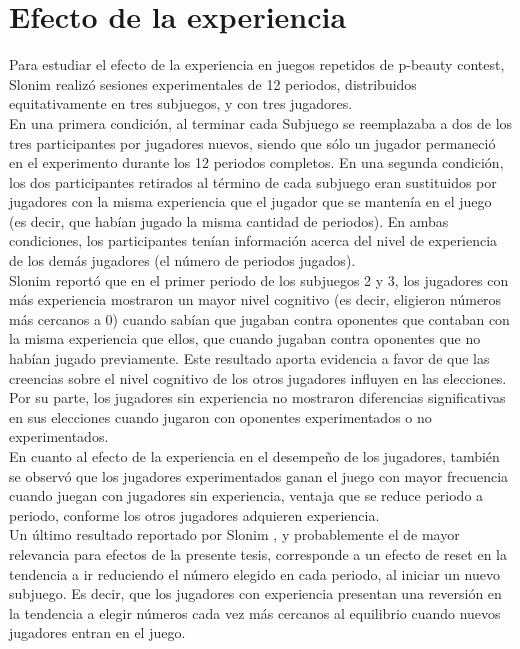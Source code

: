 \section{Efecto de la experiencia}

Para estudiar el efecto de la experiencia en juegos repetidos de p-beauty contest, Slonim \parencite*{Slonim2005} realizó sesiones experimentales de 12 periodos, distribuidos equitativamente en tres subjuegos, y con tres jugadores.\\

En una primera condición, al terminar cada Subjuego se reemplazaba a dos de los tres participantes por jugadores nuevos, siendo que sólo un jugador permaneció en el experimento durante los 12 periodos completos. En una segunda condición, los dos participantes retirados al término de cada subjuego eran sustituidos por jugadores con la misma experiencia que el jugador que se mantenía en el juego (es decir, que habían jugado la misma cantidad de periodos). En ambas condiciones, los participantes tenían información acerca del nivel de experiencia de los demás jugadores (el número de periodos jugados).\\

Slonim \parencite*{Slonim2005} reportó que en el primer periodo de los subjuegos 2 y 3, los jugadores con más experiencia mostraron un mayor nivel cognitivo (es decir, eligieron números más cercanos a 0) cuando sabían que jugaban contra oponentes que contaban con la misma experiencia que ellos, que cuando jugaban contra oponentes que no habían jugado previamente. Este resultado aporta evidencia a favor de que las creencias sobre el nivel cognitivo de los otros jugadores influyen en las elecciones. Por su parte, los jugadores sin experiencia no mostraron diferencias signiﬁcativas en sus elecciones cuando jugaron con oponentes experimentados o no experimentados.\\

En cuanto al efecto de la experiencia en el desempeño de los jugadores, también se observó que los jugadores experimentados ganan el juego con mayor frecuencia cuando juegan con jugadores sin experiencia, ventaja que se reduce periodo a periodo, conforme los otros jugadores adquieren experiencia.\\

Un último resultado reportado por Slonim \parencite*{Slonim2005}, y probablemente el de mayor relevancia para efectos de la presente tesis, corresponde a un efecto de reset en la tendencia a ir reduciendo el número elegido en cada periodo, al iniciar un nuevo subjuego. Es decir, que los jugadores con experiencia presentan una reversión en la tendencia a elegir números cada vez más cercanos al equilibrio cuando nuevos jugadores entran en el juego.\\

